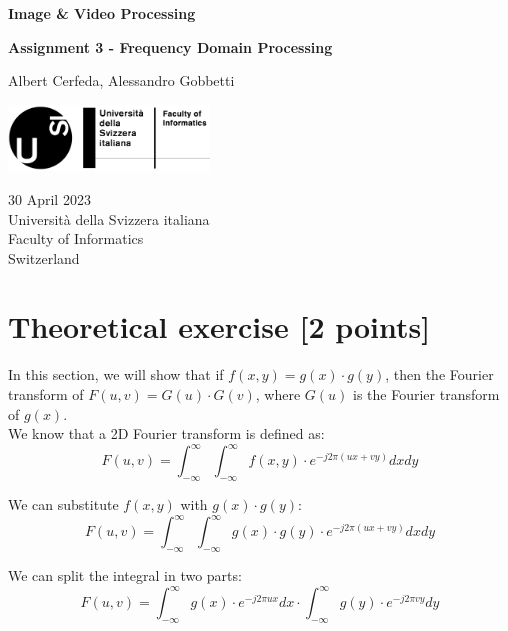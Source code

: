 \documentclass[tikz,14pt,fleqn]{article}
\newcommand\namesurname{Albert Cerfeda, Alessandro Gobbetti}
\newcommand\assignment{Assignment 3 - Frequency Domain Processing}
\newcommand\subject{Image \& Video Processing}
\newcommand\documentdate{30 April 2023}
\begin{document}
\begin{titlepage}
   \begin{center}
       \vspace*{0.2cm}

       \textbf{\Large{\subject}}

       \vspace{0.5cm}
        \textbf{\assignment}\\[5mm]
        
            
       \vspace{0.4cm}

        \namesurname
        \begin{figure}[H]
            \centering
        \end{figure}
       \tableofcontents

       \vspace*{\fill}
     
        \includegraphics[width=0.4\textwidth]{fig/logo.png}
       
        \documentdate \\
        Università della Svizzera italiana\\
        Faculty of Informatics\\
        Switzerland\\

   \end{center}
\end{titlepage}

\section{Theoretical exercise [2 points]}
In this section, we will show that if $f(x,y) = g(x)\cdot g(y)$, then the Fourier transform of $F(u,v) = G(u)\cdot G(v)$, where $G(u)$ is the Fourier transform of $g(x)$.\\
We know that a 2D Fourier transform is defined as:
$$F(u,v) = \int_{-\infty}^{\infty} \int_{-\infty}^{\infty} f(x,y) \cdot e^{-j2\pi(ux+vy)} dx dy$$

We can substitute $f(x,y)$ with $g(x)\cdot g(y)$:
$$F(u,v) = \int_{-\infty}^{\infty} \int_{-\infty}^{\infty} g(x)\cdot g(y) \cdot e^{-j2\pi(ux+vy)} dx dy$$

We can split the integral in two parts:
$$F(u,v) = \int_{-\infty}^{\infty} g(x) \cdot e^{-j2\pi ux} dx \cdot \int_{-\infty}^{\infty} g(y) \cdot e^{-j2\pi vy} dy$$
\end{document}
